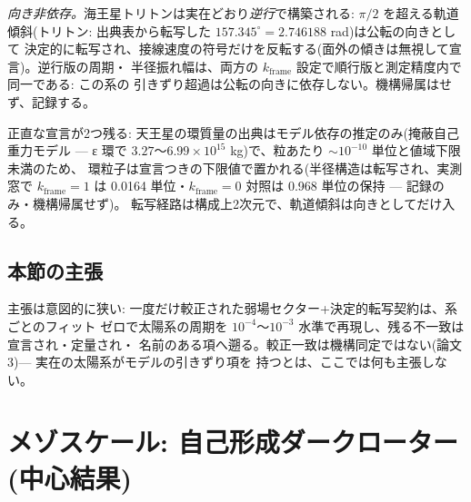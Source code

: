 \documentclass[a4paper,10pt,twocolumn]{ltjsarticle}
\begin{document}
\emph{向き非依存。}海王星トリトンは実在どおり\emph{逆行}で構築される: $\pi/2$ を超える軌道
傾斜(トリトン: 出典表から転写した $157.345^{\circ}=2.746188$ rad)は公転の向きとして
決定的に転写され、接線速度の符号だけを反転する(面外の傾きは無視して宣言)。逆行版の周期・
半径振れ幅は、両方の $k_{\mathrm{frame}}$ 設定で順行版と測定精度内で同一である: この系の
引きずり超過は公転の向きに依存しない。機構帰属はせず、記録する。

正直な宣言が2つ残る: 天王星の環質量の出典はモデル依存の推定のみ(掩蔽自己重力モデル —
ε 環で $3.27$〜$6.99\times10^{15}$ kg)で、粒あたり $\sim10^{-10}$ 単位と値域下限未満のため、
環粒子は宣言つきの下限値で置かれる(半径構造は転写され、実測窓で $k_{\mathrm{frame}}=1$
は 0.0164 単位・$k_{\mathrm{frame}}=0$ 対照は 0.968 単位の保持 — 記録のみ・機構帰属せず)。
転写経路は構成上2次元で、軌道傾斜は向きとしてだけ入る。

\subsection{本節の主張}

主張は意図的に狭い: 一度だけ較正された弱場セクター+決定的転写契約は、系ごとのフィット
ゼロで太陽系の周期を $10^{-4}$〜$10^{-3}$ 水準で再現し、残る不一致は宣言され・定量され・
名前のある項へ遡る。較正一致は機構同定ではない(論文3)— 実在の太陽系がモデルの引きずり項を
持つとは、ここでは何も主張しない。

\section{メゾスケール: 自己形成ダークローター(中心結果)}
\end{document}
